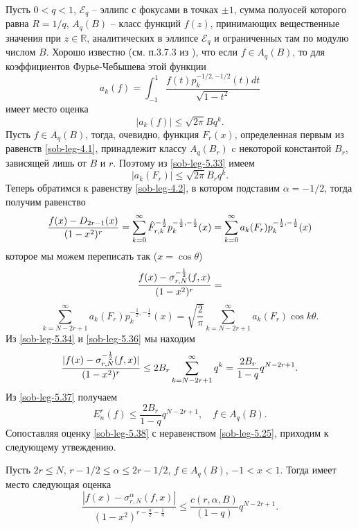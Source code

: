 Пусть $0<q<1$, $\mathcal{E}_q$ -- эллипс с фокусами в точках $\pm1$, сумма полуосей которого равна $R=1/q$, $A_q(B)$ -- класс функций $f(z)$, принимающих вещественные значения при $z\in\mathbb{R}$,  аналитических в эллипсе $\mathcal{E}_q$ и ограниченных там по модулю числом $B$. Хорошо известно  (см. п.3.7.3 из \cite{sob-leg-Timan}), что если $f\in A_q(B)$, то для коэффициентов Фурье-Чебышева этой функции
\begin{equation}\label{sob-leg-5.32}
 a_k(f)=\int_{-1}^1\frac{f(t)p_k^{-1/2,-1/2}(t)dt}{\sqrt{1-t^2}}
 \end{equation}
имеет место оценка
\begin{equation}\label{sob-leg-5.33}
 |a_k(f)|\le\sqrt{2\pi}Bq^k.
 \end{equation}
Пусть $f\in A_q(B)$, тогда, очевидно, функция $F_r(x)$, определенная первым из равенств \eqref{sob-leg-4.1},  принадлежит классу $A_q(B_r)$ c некоторой константой $B_r$, зависящей лишь от $B$  и $r$. Поэтому из \eqref{sob-leg-5.33}
имеем
\begin{equation}\label{sob-leg-5.34}
 |a_k(F_r)|\le\sqrt{2\pi}B_rq^k.
 \end{equation}
Теперь обратимся к равенству \eqref{sob-leg-4.2}, в котором подставим  $\alpha=-1/2$, тогда получим равенство
 \begin{equation}\label{sob-leg-5.35}
{f(x)-D_{2r-1}(x)\over(1-x^2)^r}=
 \sum_{k=0}^\infty \hat F_{r,k}^{-\frac12} p_{k}^{-\frac12,-\frac12}(x)=
 \sum_{k=0}^\infty a_k(F_r) p_{k}^{-\frac12,-\frac12}(x)
\end{equation}
которое мы можем переписать так ($x=\cos\theta$)
$$
{f(x)-\sigma_{r,N}^{-\frac12}(f,x)\over(1-x^2)^r}=
$$
\begin{equation}\label{sob-leg-5.36}
  \sum_{k=N-2r+1}^\infty a_k(F_r) p_{k}^{-\frac12,-\frac12}(x)=\sqrt{\frac2\pi}
  \sum_{k=N-2r+1}^\infty a_k(F_r) \cos k\theta.
\end{equation}
Из \eqref{sob-leg-5.34} и \eqref{sob-leg-5.36} мы находим
\begin{equation}\label{sob-leg-5.37}
 {|f(x)-\sigma_{r,N}^{-\frac12}(f,x)|\over(1-x^2)^r}\le 2B_r\sum_{k=N-2r+1}^\infty q^k=
 \frac{2B_r}{1-q}q^{N-2r+1}.
  \end{equation}
Из \eqref{sob-leg-5.37} получаем
\begin{equation}\label{sob-leg-5.38}
 E_{n}^r(f)\le \frac{2B_r}{1-q}q^{N-2r+1},\quad f\in A_q(B).
  \end{equation}
Сопоставляя оценку \eqref{sob-leg-5.38} с неравенством \eqref{sob-leg-5.25}, приходим к следующему утвеждению.
\begin{corollary} Пусть $2r\le N$, $r-1/2\le \alpha\le 2r-1/2$, $f\in A_q(B)$, $-1<x<1$. Тогда имеет место следующая оценка
\begin{equation}\label{sob-leg-5.39}
 \frac{|f(x)-\sigma_{r,N}^\alpha(f,x)|}
{(1-x^2)^{r-\frac{\alpha}{2}-\frac14}}\le\frac{c(r,\alpha, B)}{(1-q)}q^{N-2r+1}.
 \end{equation}
\end{corollary}



